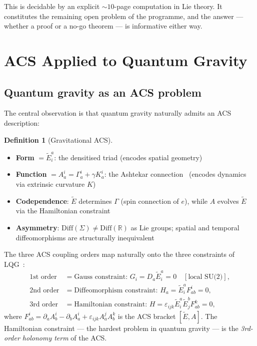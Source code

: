 \documentclass[11pt,a4paper]{article}
\theoremstyle{plain}
\theoremstyle{definition}
\newtheorem{definition}[theorem]{Definition}
\theoremstyle{remark}
\begin{document}
This is decidable by an explicit $\sim\!10$-page computation in Lie theory.  
It constitutes the remaining open problem of the programme, and the answer --- 
whether a proof or a no-go theorem --- is informative either way.


\section{ACS Applied to Quantum Gravity}
\label{sec:qg}

\subsection{Quantum gravity as an ACS problem}

The central observation is that quantum gravity naturally admits an ACS description:

\begin{definition}[Gravitational ACS]
\begin{itemize}[noitemsep]
  \item \textbf{Form} $= \tilde{E}^a_i$: the densitised triad (encodes spatial geometry)
  \item \textbf{Function} $= A^i_a = \Gamma^i_a + \gamma K^i_a$: the Ashtekar connection~\cite{Ashtekar1986}
    (encodes dynamics via extrinsic curvature $K$)
  \item \textbf{Codependence}: $\tilde{E}$ determines $\Gamma$ (spin connection of $e$),
    while $A$ evolves $\tilde{E}$ via the Hamiltonian constraint
  \item \textbf{Asymmetry}: $\mathrm{Diff}(\Sigma) \neq \mathrm{Diff}(\mathbb{R})$ as Lie groups;
    spatial and temporal diffeomorphisms are structurally inequivalent
\end{itemize}
\end{definition}

The three ACS coupling orders map naturally onto the three constraints of LQG~\cite{Rovelli2004,Thiemann2007}:
\begin{align}
  \text{1st order} &= \text{Gauss constraint: } G_i = D_a \tilde{E}^a_i = 0 \quad [\text{local SU(2)}], \\
  \text{2nd order} &= \text{Diffeomorphism constraint: } H_a = \tilde{E}^a_i F^i_{ab} = 0, \\
  \text{3rd order} &= \text{Hamiltonian constraint: } H = \varepsilon_{ijk}\tilde{E}^a_i\tilde{E}^b_j F^k_{ab} = 0,
\end{align}
where $F^i_{ab} = \partial_a A^i_b - \partial_b A^i_a + \varepsilon_{ijk}A^j_aA^k_b$
is the ACS bracket $[\tilde{E}, A]$.  The Hamiltonian constraint --- the hardest problem
in quantum gravity --- is the \emph{3rd-order holonomy term} of the ACS.
\end{document}
